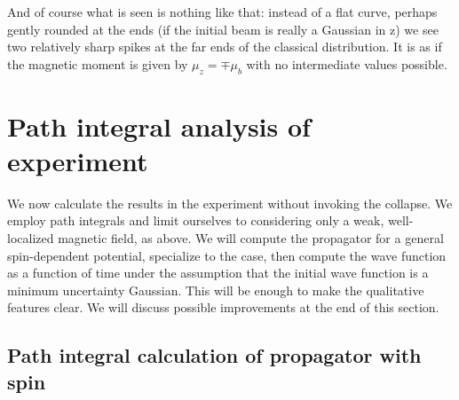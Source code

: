 \documentclass[aps,prl,superscriptaddress,12pt]{revtex4-2}
\begin{document}
And of course what is seen is nothing like that: instead of a flat curve, 
	perhaps gently rounded at the ends (if the initial beam is really a Gaussian in z) 
	we see two relatively sharp spikes at the far ends of the classical distribution. 
It is as if the magnetic moment is given by $\mu_z=\mp \mu_b$
	with no intermediate values possible.

\section{Path integral analysis of \sg experiment}

We now calculate the results in the \sg experiment without invoking the collapse. 
We employ path integrals and limit ourselves to considering only a weak, well-localized magnetic field, as above. 
We will compute the propagator for a general spin-dependent potential, 
	specialize to the \sg case,
	then compute the wave function as a function of time 
	under the assumption that the initial wave function is a minimum uncertainty Gaussian. 
This will be enough to make the qualitative features clear. 
We will discuss possible improvements at the end of this section.

\subsection{Path integral calculation of propagator with spin}
\end{document}
